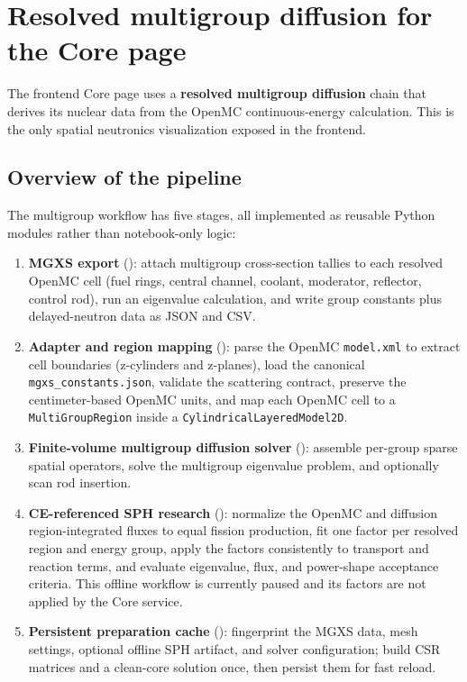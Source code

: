 \documentclass[11pt]{article}
\begin{document}
\section{Resolved multigroup diffusion for the Core page}

The frontend Core page uses a \textbf{resolved multigroup diffusion} chain that
derives its nuclear data from the OpenMC continuous-energy calculation.  This
is the only spatial neutronics visualization exposed in the frontend.

\subsection{Overview of the pipeline}

The multigroup workflow has five stages, all implemented as reusable Python
modules rather than notebook-only logic:

\begin{enumerate}
  \item \textbf{MGXS export} ():
        attach multigroup cross-section tallies to each resolved OpenMC cell
        (fuel rings, central channel, coolant, moderator, reflector, control
        rod), run an eigenvalue calculation, and write group constants plus
        delayed-neutron data as JSON and CSV.
  \item \textbf{Adapter and region mapping}
        ():
        parse the OpenMC \texttt{model.xml} to extract cell boundaries
        (z-cylinders and z-planes), load the canonical
        \texttt{mgxs\_constants.json}, validate the scattering contract,
        preserve the centimeter-based OpenMC units, and map each OpenMC cell to a
        \texttt{MultiGroupRegion} inside a \texttt{CylindricalLayeredModel2D}.
  \item \textbf{Finite-volume multigroup diffusion solver}
        ():
        assemble per-group sparse spatial operators, solve the multigroup
        eigenvalue problem, and optionally scan rod insertion.
  \item \textbf{CE-referenced SPH research}
        ():
        normalize the OpenMC and diffusion region-integrated fluxes to equal
        fission production, fit one factor per resolved region and energy
        group, apply the factors consistently to transport and reaction terms,
        and evaluate eigenvalue, flux, and power-shape acceptance criteria.
        This offline workflow is currently paused and its factors are not
        applied by the Core service.
  \item \textbf{Persistent preparation cache}
        ():
        fingerprint the MGXS data, mesh settings, optional offline SPH
        artifact, and solver configuration; build CSR matrices and a
        clean-core solution once, then persist them for fast reload.
\end{enumerate}
\end{document}
